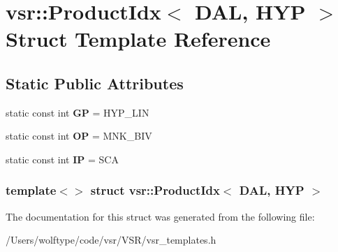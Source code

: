 \hypertarget{structvsr_1_1_product_idx_3_01_d_a_l_00_01_h_y_p_01_4}{\section{vsr\-:\-:Product\-Idx$<$ D\-A\-L, H\-Y\-P $>$ Struct Template Reference}
\label{structvsr_1_1_product_idx_3_01_d_a_l_00_01_h_y_p_01_4}
}
\subsection*{Static Public Attributes}
\begin{DoxyCompactItemize}
\item 
\hypertarget{structvsr_1_1_product_idx_3_01_d_a_l_00_01_h_y_p_01_4_a7e6ce7c85b286e8909dd1f50febf858e}{static const int {\bfseries G\-P} = H\-Y\-P\-\_\-\-L\-I\-N}\label{structvsr_1_1_product_idx_3_01_d_a_l_00_01_h_y_p_01_4_a7e6ce7c85b286e8909dd1f50febf858e}

\item 
\hypertarget{structvsr_1_1_product_idx_3_01_d_a_l_00_01_h_y_p_01_4_afa682cec3c93ac8f54580654b8a757ce}{static const int {\bfseries O\-P} = M\-N\-K\-\_\-\-B\-I\-V}\label{structvsr_1_1_product_idx_3_01_d_a_l_00_01_h_y_p_01_4_afa682cec3c93ac8f54580654b8a757ce}

\item 
\hypertarget{structvsr_1_1_product_idx_3_01_d_a_l_00_01_h_y_p_01_4_a40bea38ee3fca86c8185ef7e786a40c1}{static const int {\bfseries I\-P} = S\-C\-A}\label{structvsr_1_1_product_idx_3_01_d_a_l_00_01_h_y_p_01_4_a40bea38ee3fca86c8185ef7e786a40c1}

\end{DoxyCompactItemize}
\subsubsection*{template$<$$>$ struct vsr\-::\-Product\-Idx$<$ D\-A\-L, H\-Y\-P $>$}



The documentation for this struct was generated from the following file\-:\begin{DoxyCompactItemize}
\item 
/\-Users/wolftype/code/vsr/\-V\-S\-R/vsr\-\_\-templates.\-h\end{DoxyCompactItemize}
